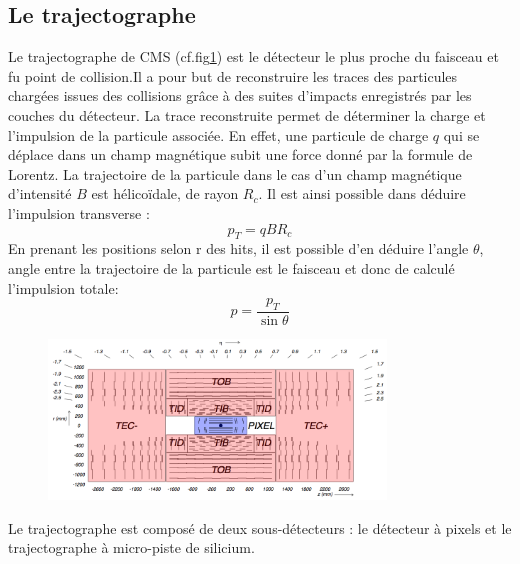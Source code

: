 \subsection{Le trajectographe}
Le trajectographe de CMS (cf.fig\ref{trajectographe}) est le détecteur le plus proche du faisceau et fu point de collision.Il a pour but de reconstruire les traces des particules chargées issues des collisions grâce à des suites d'impacts enregistrés par les couches du détecteur. La trace reconstruite permet de déterminer la charge et l'impulsion de la particule associée. En effet, une particule de charge $q$ qui se déplace dans un champ magnétique subit une force donné par la formule de Lorentz. La trajectoire de la particule dans le cas d'un champ magnétique d'intensité $B$ est hélicoïdale, de rayon $R_{c}$. Il est ainsi possible dans déduire l'impulsion transverse :
\begin{equation}
p_{T}=qBR_{c}
\end{equation}
En prenant les positions selon r des hits, il est possible d'en déduire l'angle $\theta$, angle entre la trajectoire de la particule est le faisceau et donc de calculé l'impulsion totale:
\begin{equation}
p=\frac{p_{T}}{\sin\theta}
\end{equation}
\begin{figure}[ht!]
	\centering
	\includegraphics[width=0.80\textwidth]{CMS/tracker.png}
	\label{trajectographe}
\end{figure}

Le trajectographe est composé de deux sous-détecteurs : le détecteur à pixels et le trajectographe à micro-piste de silicium.
